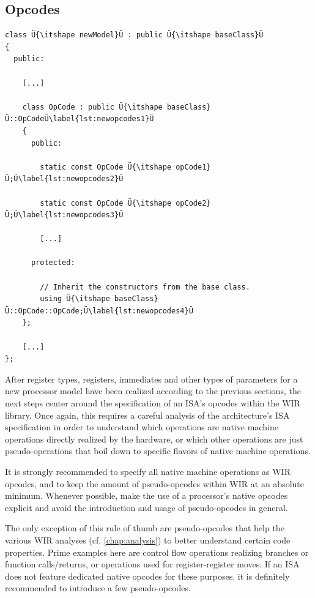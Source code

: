 \subsection{Opcodes}
\label{ssec:newopcodes}

\begin{lstlisting}[style=code,float=t,caption={Declaration of a New Processor Model's OpCodes},label=lst:newopcodes]
class Ü{\itshape newModel}Ü : public Ü{\itshape baseClass}Ü
{
  public:

    [...]

    class OpCode : public Ü{\itshape baseClass}Ü::OpCodeÜ\label{lst:newopcodes1}Ü
    {
      public:

        static const OpCode Ü{\itshape opCode1}Ü;Ü\label{lst:newopcodes2}Ü

        static const OpCode Ü{\itshape opCode2}Ü;Ü\label{lst:newopcodes3}Ü

        [...]

      protected:

        // Inherit the constructors from the base class.
        using Ü{\itshape baseClass}Ü::OpCode::OpCode;Ü\label{lst:newopcodes4}Ü
    };

    [...]
};
\end{lstlisting}

After register types, registers, immediates and other types of parameters for a new processor model have been realized according to the previous sections, the next steps center around the specification of an \gls{ISA}'s opcodes within the \gls{WIR} library.
Once again, this requires a careful analysis of the architecture's \gls{ISA} specification in order to understand which operations are native machine operations directly realized by the hardware, or which other operations are just pseudo-operations that boil down to specific flavors of native machine operations.
\begin{wirNote}
It is strongly recommended to specify all native machine operations as \gls{WIR} opcodes, and to keep the amount of pseudo-opcodes within \gls{WIR} at an absolute minimum.\label{note:pseudoops}
Whenever possible, make the use of a processor's native opcodes explicit and avoid the introduction and usage of pseudo-opcodes in general.

The only exception of this rule of thumb are pseudo-opcodes that help the various \gls{WIR} analyses (cf. \cref{chap:analysis}) to better understand certain code properties.
Prime examples here are control flow operations realizing branches or function calls/returns, or operations used for register-register moves.
If an \gls{ISA} does not feature dedicated native opcodes for these purposes, it is definitely recommended to introduce a few pseudo-opcodes.
\end{wirNote}

